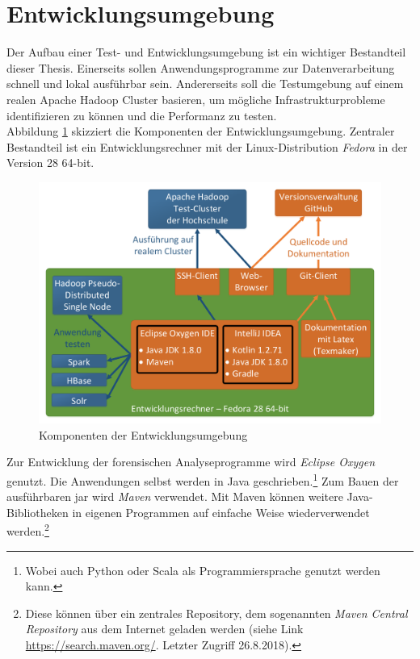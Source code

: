 \clearpage
\section{Entwicklungsumgebung}
\label{development_environment}
Der Aufbau einer Test- und Entwicklungsumgebung ist ein wichtiger Bestandteil dieser Thesis. Einerseits sollen Anwendungsprogramme zur Datenverarbeitung schnell und lokal ausführbar sein. Andererseits soll die Testumgebung auf einem realen Apache Hadoop Cluster basieren, um mögliche Infrastrukturprobleme identifizieren zu können und die Performanz zu testen. \\

\noindent
Abbildung \ref{fig:development_environment} skizziert die Komponenten der Entwicklungsumgebung. Zentraler Bestandteil ist ein Entwicklungsrechner mit der Linux-Distribution \textit{Fedora} in der Version 28 64-bit.

\begin{figure}[ht]
  \centering
  \includegraphics[width=\textwidth]{./resource/development_environment.pdf}
  \caption{Komponenten der Entwicklungsumgebung}
  \label{fig:development_environment}
\end{figure} 

\noindent
Zur Entwicklung der forensischen Analyseprogramme wird \textit{Eclipse Oxygen} genutzt. Die Anwendungen selbst werden in Java geschrieben.\footnote{Wobei auch Python oder Scala als Programmiersprache genutzt werden kann.} Zum Bauen der ausführbaren \gls{jar} wird \textit{Maven} verwendet. Mit Maven können weitere Java-Bibliotheken 
in eigenen Programmen auf einfache Weise wiederverwendet werden.\footnote{Diese können über ein zentrales Repository, dem sogenannten \textit{Maven Central Repository} aus dem Internet geladen werden (siehe Link \url{https://search.maven.org/}. Letzter Zugriff 26.8.2018).}\\

